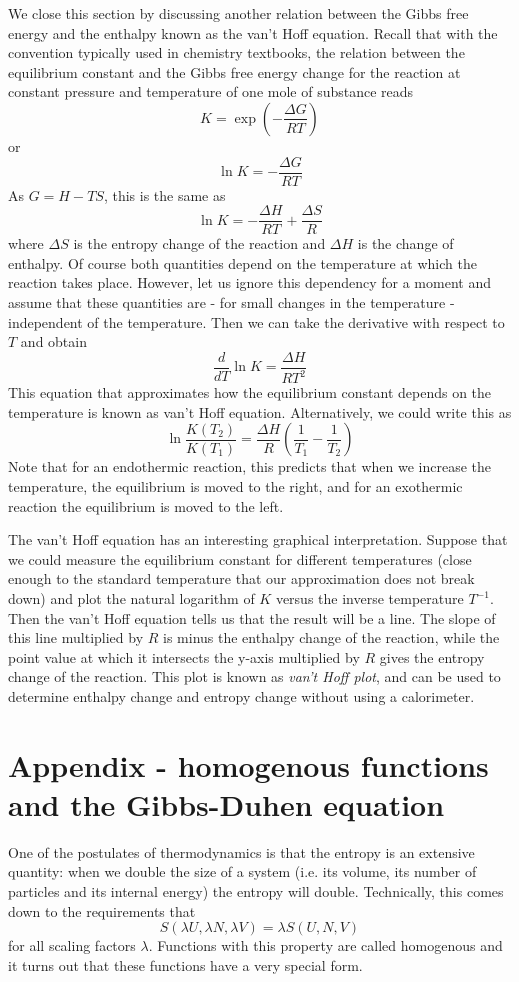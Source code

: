 \documentclass[a4paper, draft]{report}
\numberwithin{section}{chapter}
\numberwithin{equation}{chapter}
\theoremstyle{own}
\theoremstyle{remark}
\begin{document}
We close this section by discussing another relation between the Gibbs free energy and the enthalpy known as the van't Hoff equation. Recall that with the convention typically used in chemistry textbooks, the relation between the equilibrium constant and the Gibbs free energy change for the reaction at constant pressure and temperature of one mole of substance reads
$$
K = \exp (- \frac{\Delta G}{R T})
$$
or
$$
\ln K = - \frac{\Delta G}{R T}
$$
As $G = H - TS$, this is the same as
$$
\ln K = - \frac{\Delta H}{R T} + \frac{\Delta S}{R}
$$
where $\Delta S$ is the entropy change of the reaction and $\Delta H$ is the change of enthalpy. Of course both quantities depend on the temperature at which the reaction takes place. However, let us ignore this dependency for a moment and assume that these quantities are - for small changes in the temperature - independent of the temperature. Then we can take the derivative with respect to $T$ and obtain
$$
\frac{d}{dT} \ln K =  \frac{\Delta H}{R T^2} 
$$
This equation that approximates how the equilibrium constant depends on the temperature is known as van't Hoff equation. Alternatively, we could write this as
$$
\ln \frac{K(T_2)}{K(T_1)} =  \frac{\Delta H}{R} (\frac{1}{T_1} - \frac{1}{T_2})
$$
Note that for an endothermic reaction, this predicts that when we increase the temperature, the equilibrium is moved to the right, and for an exothermic reaction the equilibrium is moved to the left. 

The van't Hoff equation has an interesting graphical interpretation. Suppose that we could measure the equilibrium constant for different temperatures (close enough to the standard temperature that our approximation does not break down) and plot the natural logarithm of $K$ versus the inverse temperature $T^{-1}$. Then the van't Hoff equation tells us that the result will be a line. The slope of this line multiplied by $R$ is minus the enthalpy change of the reaction, while the point value at which it intersects the y-axis multiplied by $R$ gives the entropy change of the reaction. This plot is known as {\em van't Hoff plot}, and can be used to determine enthalpy change and entropy change without using a calorimeter.

\section{Appendix - homogenous functions and the Gibbs-Duhen equation}

One of the postulates of thermodynamics is that the entropy is an extensive quantity: when we double the size of a system (i.e. its volume, its number of particles and its internal energy) the entropy will double. Technically, this comes down to the requirements that
$$
S(\lambda U, \lambda N, \lambda V ) = \lambda S(U, N, V)
$$
for all scaling factors $\lambda$. Functions with this property are called homogenous and it turns out that these functions have a very special form.
\end{document}
